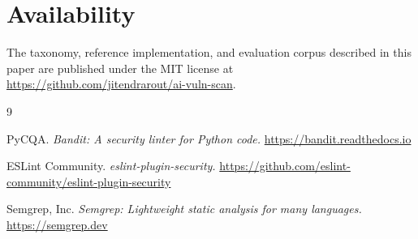 \documentclass[11pt]{article}
\begin{document}
\section*{Availability}
The taxonomy, reference implementation, and evaluation corpus described
in this paper are published under the MIT license at
\url{https://github.com/jitendrarout/ai-vuln-scan}.

\begin{thebibliography}{9}

PyCQA. \emph{Bandit: A security linter for Python code.}
\url{https://bandit.readthedocs.io}

ESLint Community. \emph{eslint-plugin-security.}
\url{https://github.com/eslint-community/eslint-plugin-security}

Semgrep, Inc. \emph{Semgrep: Lightweight static analysis for many languages.}
\url{https://semgrep.dev}

\end{thebibliography}
\end{document}
